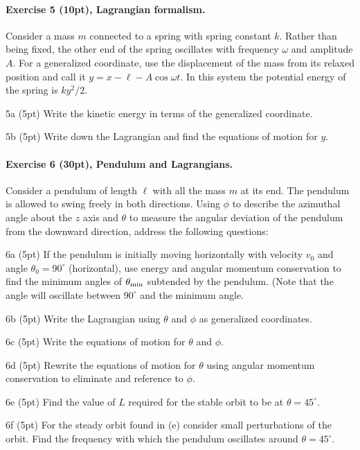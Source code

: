 \documentclass[%
oneside,                 %
final,                   %
10pt]{article}
\begin{document}
\paragraph{Exercise 5 (10pt), Lagrangian formalism.}
Consider a mass $m$ connected to a spring with spring constant
  $k$. Rather than being fixed, the other end of the spring oscillates
  with frequency $\omega$ and amplitude $A$. For a generalized
  coordinate, use the displacement of the mass from its relaxed
  position and call it $y=x-\ell-A\cos\omega t$. In this system the
  potential energy of the spring is $ky^2/2$.


\item 5a (5pt)  Write the kinetic energy in terms of the generalized coordinate.

\item 5b (5pt) Write down the Lagrangian and find the equations of motion for $y$.


\paragraph{Exercise 6 (30pt), Pendulum and Lagrangians.}
Consider a pendulum of length $\ell$ with all the mass $m$ at
  its end. The pendulum is allowed to swing freely in both
  directions. Using $\phi$ to describe the azimuthal angle about the
  $z$ axis and $\theta$ to measure the angular deviation of the
  pendulum from the downward direction, address the following
  questions:


\item 6a (5pt) If the pendulum is initially moving horizontally with velocity $v_0$ and angle $\theta_0=90^\circ$ (horizontal), use energy and angular momentum conservation to find the minimum angles of $\theta_{\rm min}$ subtended by the pendulum. (Note that the angle  will oscillate between $90^\circ$ and the minimum angle.

\item 6b (5pt) Write the Lagrangian using $\theta$ and $\phi$ as generalized coordinates.

\item 6c (5pt) Write the equations of motion for $\theta$ and $\phi$.

\item 6d (5pt) Rewrite the equations of motion for $\theta$ using angular momentum conservation to eliminate and reference to $\phi$.

\item 6e (5pt) Find the value of $L$ required for the stable orbit to be at $\theta=45^\circ$.

\item 6f (5pt)  For the steady orbit found in (e) consider small perturbations of the orbit. Find the frequency with which the pendulum oscillates around $\theta=45^\circ$.



\end{document}
